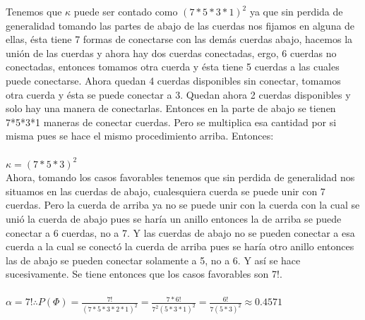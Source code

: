\documentclass[12pt,a4paper]{report}
\begin{document}
\begin{enumerate}
{    Tenemos que $\kappa$ puede ser contado como $(7*5*3*1)^2$ ya que sin perdida de generalidad tomando las partes de abajo de las cuerdas nos fijamos en alguna de ellas, ésta tiene 7 formas de conectarse con las demás cuerdas abajo, hacemos la unión de las cuerdas y ahora  hay dos cuerdas conectadas, ergo, 6 cuerdas no conectadas, entonces tomamos otra cuerda y ésta tiene 5 cuerdas a las cuales puede conectarse. Ahora quedan 4 cuerdas disponibles sin conectar, tomamos otra cuerda y ésta se puede conectar a 3. Quedan ahora 2 cuerdas disponibles y solo hay una manera de conectarlas. Entonces en la parte de abajo se tienen 7*5*3*1 maneras de conectar cuerdas. Pero se multiplica esa cantidad por si misma pues se hace el mismo procedimiento arriba. Entonces: \\ \\
    $\kappa= (7*5*3)^2$\\

    Ahora, tomando los casos favorables tenemos que sin perdida de generalidad nos situamos en las cuerdas de abajo, cualesquiera cuerda se puede unir con 7 cuerdas. Pero la cuerda de arriba ya no se puede unir con la cuerda con la cual se unió la cuerda de abajo pues se haría un anillo entonces la de arriba se puede conectar a 6 cuerdas, no a 7. Y las cuerdas de abajo no se pueden conectar a esa cuerda a la cual se conectó la cuerda de arriba pues se haría otro anillo entonces las de abajo se pueden conectar solamente a 5, no a 6. Y así se hace sucesivamente. Se tiene entonces que los casos favorables son 7!. \\ \\
    $\alpha = 7! \therefore P(\Phi)=\frac{7!}{(7*5*3*2*1)^2}=\frac{7*6!}{7^2(5*3*1)^2}=\frac{6!}{7(5*3)^2} \approx 0.4571$
	}



\end{enumerate}
\end{document}
